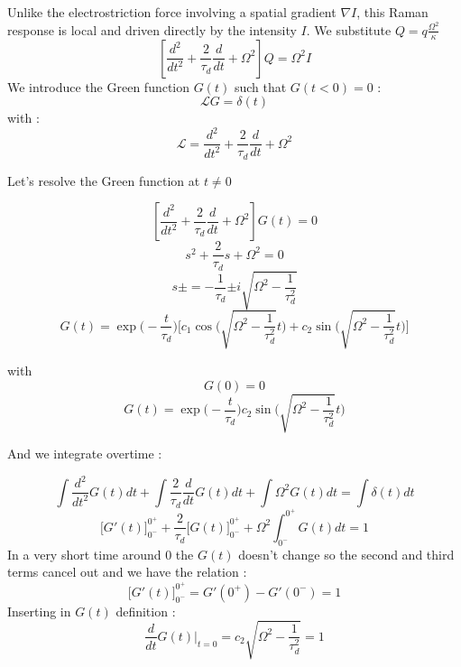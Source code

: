 \documentclass[11pt,a4paper]{article}
\begin{document}
Unlike the electrostriction force involving a spatial gradient $\nabla I$, this Raman response is local and driven directly by the intensity $I$.
We substitute $Q = q\frac{\Omega^2}{\kappa}$
\begin{equation*}
\left[ \frac{d^2}{dt^2} + \frac{2}{\tau_d}\frac{d}{dt} + \Omega^2 \right] Q = \Omega^2 I
\end{equation*}
We introduce the Green function $G(t)$ such that $G(t<0)=0$ : 
\begin{equation*}
    \mathcal{L}G=\delta(t)
\end{equation*}
with :
\begin{equation*}
    \mathcal{L}= \frac{d^2}{dt^2} + \frac{2}{\tau_d}\frac{d}{dt} + \Omega^2
\end{equation*}

Let's resolve the Green function at $t\ne0$

\begin{equation*}
\left[ \frac{d^2}{dt^2} + \frac{2}{\tau_d}\frac{d}{dt} + \Omega^2 \right] G(t)  = 0
\end{equation*}
\begin{equation*}
s^2+\frac{2}{\tau_d}s+\Omega^2=0
\end{equation*}
\begin{equation*}
s\pm = -\frac{1}{\tau_d}{\pm i\sqrt{\Omega^2-\frac{1}{\tau_d^2}}}
\end{equation*}
\begin{equation*}
G(t) = \exp{\bigg(-\frac{t}{\tau_d}\bigg)}\Bigg[c_1\cos{\Bigg(\sqrt{\Omega^2-\frac{1}{\tau_d^2}}}t\Bigg)+c_2\sin{\Bigg(\sqrt{\Omega^2-\frac{1}{\tau_d^2}}}t\Bigg)\Bigg]
\end{equation*}

with $$ G(0) = 0$$
\begin{equation*}
G(t) = \exp{\bigg(-\frac{t}{\tau_d}\bigg)}c_2\sin{\Bigg(\sqrt{\Omega^2-\frac{1}{\tau_d^2}}}t\Bigg)
\end{equation*}

And we integrate overtime : 

\begin{equation*}
    \int \frac{d^2}{dt^2}G(t)dt + \int\frac{2}{\tau_d}\frac{d}{dt}G(t)dt + \int\Omega^2G(t)dt = \int \delta(t)dt
    \end{equation*}
\begin{equation*}
    \bigg[G'(t)\bigg]^{0^+}_{0^-}+\frac{2}{\tau_d}\bigg[G(t)\bigg]^{0^+}_{0^-}+\Omega^2\int^{0^+}_{0^-} G(t)dt = 1
\end{equation*}
In a very short time around $0$ the $G(t)$ doesn't change so the second and third terms cancel out and we have the relation : 
\begin{equation*}
    \bigg[G'(t)\bigg]^{0^+}_{0^-}=G'(0^+)-G'(0^-)  = 1
\end{equation*}
Inserting in $G(t)$ definition : 
\begin{equation*}
\frac{d}{dt}G(t)\bigg|_{t=0} =  c_2\sqrt{\Omega^2-\frac{1}{\tau_d^2}}=1
\end{equation*}
\end{document}
